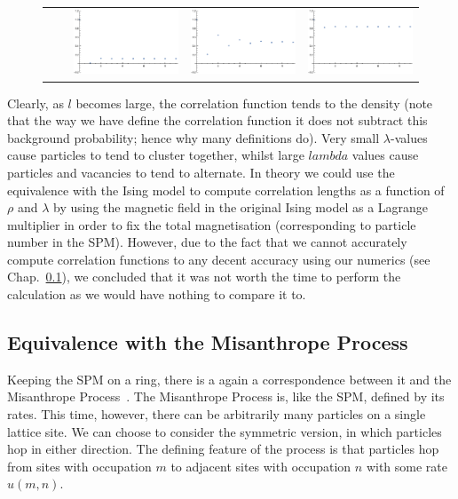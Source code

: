 \begin{figure}[h!]
\begin{center}
\begin{tabular}{c  c | c | c | c}
    \hline
    \raisebox{3 em}{ $10$ } & &    \includegraphics[width=0.25\linewidth]{analytics/images/exactCorrFns/lowDensHighL}  & \includegraphics[width=0.25 \linewidth]{analytics/images/exactCorrFns/midDensHighL} & \includegraphics[width=0.25 \linewidth]{analytics/images/exactCorrFns/highDensHighL} \\
    \end{tabular}
\end{center}
    \vspace{-2em}
\end{figure}

Clearly, as $l$ becomes large, the correlation function tends to the density (note that the way we have define the correlation function it does not subtract this background probability; hence why many definitions do). Very small $\lambda$-values
cause particles to tend to cluster together, whilst large $lambda$ values cause particles and vacancies to tend to alternate. In theory we could use the equivalence with the Ising model to compute correlation lengths as a function
of $\rho$ and $\lambda$ by using the magnetic field in the original Ising model as a Lagrange multiplier in order to fix the total magnetisation (corresponding to particle number in the SPM). However, due to the fact that we cannot
accurately compute correlation functions to any decent accuracy using our numerics (see Chap.~\ref{}), we concluded that it was not worth the time to perform the calculation as we would have nothing to compare it to.

\subsection{Equivalence with the Misanthrope Process}
Keeping the SPM on a ring, there is a again a correspondence between it and the Misanthrope Process~\cite{evansWaclaw2014}. The Misanthrope Process is, like the SPM, defined by its rates. This time, however, there can be arbitrarily many particles
on a single lattice site. We can choose to consider the symmetric version, in which particles hop in either direction. The defining feature of the process is that particles hop from sites with occupation $m$ to adjacent sites with occupation
$n$ with some rate $u(m, n)$.

